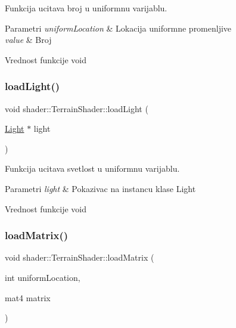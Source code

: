Funkcija ucitava broj u uniformnu varijablu. 


\begin{DoxyParams}{Parametri}
{\em uniform\+Location} & Lokacija uniformne promenljive \\
\hline
{\em value} & Broj \\
\hline
\end{DoxyParams}
\begin{DoxyReturn}{Vrednost funkcije}
void 
\end{DoxyReturn}
\mbox{\label{classshader_1_1TerrainShader_a4c45561760ed2142804589352a820acd}} 
\subsubsection{\texorpdfstring{load\+Light()}{loadLight()}}
{\footnotesize\ttfamily void shader\+::\+Terrain\+Shader\+::load\+Light (\begin{DoxyParamCaption}\item[{\hyperlink{classentity_1_1Light}{Light} $\ast$}]{light }\end{DoxyParamCaption})}



Funkcija ucitava svetlost u uniformnu varijablu. 


\begin{DoxyParams}{Parametri}
{\em light} & Pokazivac na instancu klase Light \\
\hline
\end{DoxyParams}
\begin{DoxyReturn}{Vrednost funkcije}
void 
\end{DoxyReturn}
\mbox{\label{classshader_1_1TerrainShader_a855daf1b36bc119a554caf0465c52400}} 
\subsubsection{\texorpdfstring{load\+Matrix()}{loadMatrix()}}
{\footnotesize\ttfamily void shader\+::\+Terrain\+Shader\+::load\+Matrix (\begin{DoxyParamCaption}\item[{int}]{uniform\+Location,  }\item[{mat4}]{matrix }\end{DoxyParamCaption})}



